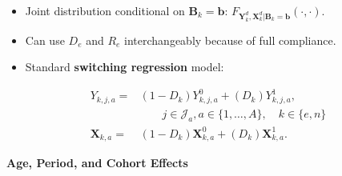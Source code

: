 \documentclass[static]{JJH-Beamer}
\begin{document}
\begin{frame}

\begin{itemize}
\item Joint distribution conditional on $\bm{B}_k = \bm{b}$: $F_{\bm{Y}_k^d, \bm{X}_k^d | \bm{B}_k = \bm{b}}(\cdot,\cdot)$.
\item Can use $D_e$ and $R_e$ interchangeably because of full compliance.
\item Standard \textbf{\citet{Quandt_1972_JASA}} \textbf{switching regression} model:
\end{itemize}

\begin{align}\label{eq:countersystem}
Y_{k,j,a} =& \left( 1 - D_k \right) Y_{k,j,a}^0 + \left( D_k \right) Y_{k,j,a}^1, \\
& \qquad j \in \mathcal{J}_a, a \in \{1,\dots,A\}, \quad k \in \{e,n\} \nonumber \\
\bm{X}_{k,a} =& \left( 1 - D_k \right) \bm{X}_{k,a}^0 + \left( D_k \right) \bm{X}_{k,a}^1. \nonumber
\end{align}

\end{frame}

\begin{frame}

\begin{center}
\textbf{Age, Period, and Cohort Effects}
\end{center}

\end{frame}
\end{document}
